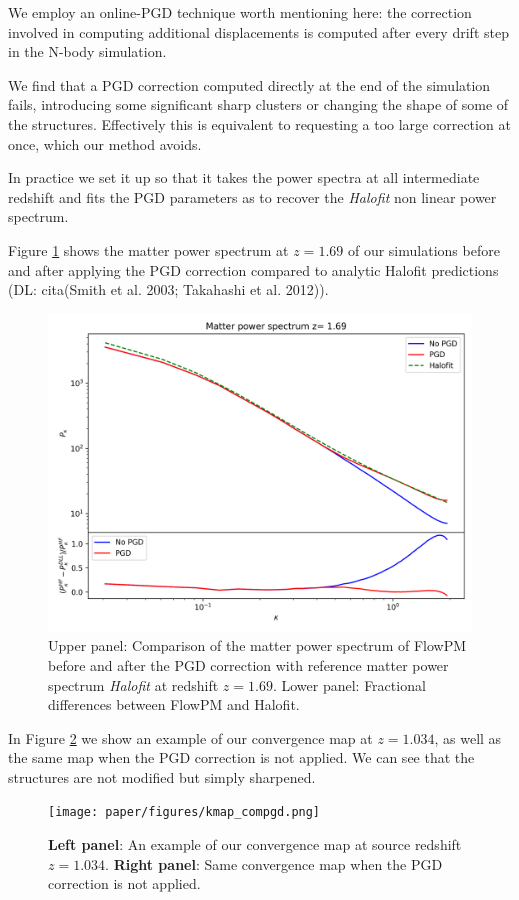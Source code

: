 \documentclass[twocolumn,twocolappendix]{aastex63}
\newcommand{\denise}[1]{{\color{red}DL: #1}}
\begin{document}
We employ an online-PGD technique worth mentioning here: the correction involved in computing additional displacements is computed after every drift step in the N-body simulation. 


We find that a PGD correction computed directly at the end of the simulation fails, introducing some significant sharp clusters or changing the shape of some of the structures. Effectively this is equivalent to requesting a too large correction at once, which our method avoids.

In practice we set it up so that it takes the power spectra at all intermediate redshift and fits the PGD parameters as to recover the \textit{Halofit} non linear power spectrum.



Figure \ref{fig:pkhalofit_comp} shows the matter power spectrum at $z=1.69$ of our simulations before and after applying the PGD correction compared to analytic Halofit predictions (\denise{cita}(Smith et al. 2003; Takahashi et al. 2012)).
\begin{figure}
    \centering
    \includegraphics[width=\columnwidth]{paper/figures/pkhalofit_comp.png}
    \caption{
    Upper panel: Comparison of the matter power spectrum of FlowPM before and after the PGD correction with reference matter power spectrum \textit{Halofit} at redshift $z = 1.69$. Lower panel: Fractional differences between FlowPM and Halofit.
    }
    \label{fig:pkhalofit_comp}
\end{figure}

In Figure \ref{fig:comp_kmap} we show an example of our convergence map at $ z= 1.034$, as well as the same map when the PGD correction is not applied. 
We can see that the structures are not modified but simply sharpened.
\begin{figure}
    \centering
    \texttt{[image: paper/figures/kmap\_compgd.png]}
    \caption{ \textbf{Left panel}: An example of our convergence map at source redshift $z= 1.034$.
    \textbf{Right panel}: Same convergence map when the PGD correction is not applied.}
    \label{fig:comp_kmap}
\end{figure}
\end{document}
